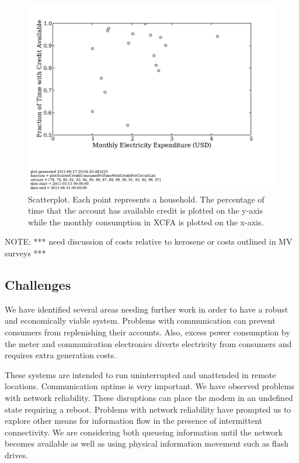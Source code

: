 \documentclass[conference]{IEEEtran}
\newcommand{\note}[1]{{\color{red} NOTE: *** #1 ***}}
\begin{document}
\begin{figure}[]
\begin{center}
\includegraphics[trim = 0in 1.3in 0in 0in, clip, width=\columnwidth]
                {figures/scatterCreditTime.pdf}
\end{center}
\caption{Scatterplot.  Each point represents a household.  The percentage
of time that the account has available credit is plotted on the y-axis while
the monthly consumption in XCFA is plotted on the x-axis.}
\label{scatterCreditTime}
\end{figure}

\note{need discussion of costs relative to kerosene or costs outlined in
MV surveys}

\subsection{Challenges}
We have identified several areas needing further work in order to have
a robust and economically viable system.  Problems with communication
can prevent consumers from replenishing their accounts.  Also, excess
power consumption by the meter and communication electronics diverts
electricity from consumers and requires extra generation costs.

These systems are intended to run uninterrupted and unattended in
remote locations.  Communication uptime is very important.  We have
observed problems with network reliability.  These disruptions can
place the modem in an undefined state requiring a reboot.
Problems with network reliability have prompted us to explore other
means for information flow in the presence of intermittent connectivity.
We are considering both queueing information until the network becomes
available as well as using physical information movement such as flash
drives.
\end{document}

